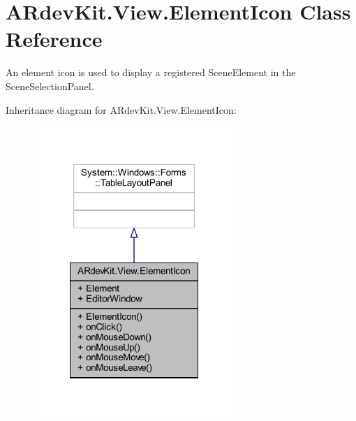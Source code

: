 \hypertarget{class_a_rdev_kit_1_1_view_1_1_element_icon}{\section{A\-Rdev\-Kit.\-View.\-Element\-Icon Class Reference}
\label{class_a_rdev_kit_1_1_view_1_1_element_icon}
}


An element icon is used to display a registered Scene\-Element in the Scene\-Selection\-Panel.  




Inheritance diagram for A\-Rdev\-Kit.\-View.\-Element\-Icon\-:
\nopagebreak
\begin{figure}[H]
\begin{center}
\leavevmode
\includegraphics[width=216pt]{class_a_rdev_kit_1_1_view_1_1_element_icon__inherit__graph}
\end{center}
\end{figure}


